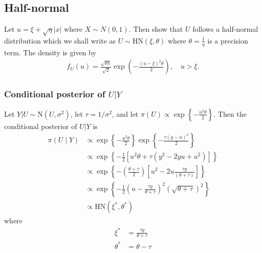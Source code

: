 
\subsection*{Half-normal}\label{s:hn}
Let $u = \xi + \sqrt{\eta} |x|$ where $X \sim N(0, 1)$.
Then \citet{Wiper2008} show that $U$ follows a half-normal distribution which we shall write as $U \sim \mbox{HN}(\xi, \theta )$ where $\theta = \displaystyle \frac{ 1 }{ \eta }$ is a precision term.
The density is given by 
\begin{align}
  f_U(u) = \frac{ \sqrt{\theta \pi} }{ \sqrt{2} } \exp \left( - \frac{ (u-\xi)^2 \theta }{ 2 } \right), \quad u > \xi.
\end{align}

\subsubsection*{Conditional posterior of $U | Y$}\label{s:condu}
Let $Y | U \sim \mbox{N}(U, \sigma^2)$, let $\tau = 1 / \sigma^2$, and let $\pi(U) \propto \exp \left\{ -\frac{ u^2 \theta }{ 2 } \right\}$. 
Then the conditional posterior of $U | Y$ is 
\begin{align}
  \pi (U \mid Y) & \propto \exp \left\{ -\frac{ u^2 \theta }{ 2 } \right\} \exp \left\{ - \frac{ \tau (y - u)^2 }{ 2 } \right\} \nonumber \\
    & \propto \exp \left\{ -\frac{ 1 }{ 2 } \left[ u^2 \theta + \tau (y^2 - 2yu + u^2) \right] \right\} \nonumber \\
    & \propto \exp \left\{ -\left( \frac{ \theta + \tau }{ 2 } \right) \left[ u^2 - 2u \frac{ \tau y }{ (\theta + \tau )} \right] \right\} \nonumber \\
    & \propto \exp \left\{ - \frac{ 1 }{ 2 }\left( u - \frac{ \tau y }{ \theta + \tau } \right)^2 \left( \sqrt{ \theta + \tau } \right)^2 \right\} \nonumber\\
    & \propto \mbox{HN}(\xi^*, \theta^*) \label{eq:condu}
\end{align}
where 
\begin{align*}
  \xi^* &= \frac{ \tau y }{ \theta + \tau }\\
  \theta^* &= \theta - \tau
\end{align*}

